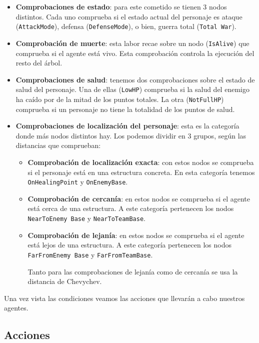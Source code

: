 \begin{itemize}
    \item \textbf{Comprobaciones de estado}: para este cometido se tienen 3 nodos distintos. Cada uno comprueba si el estado actual del personaje es ataque (\texttt{AttackMode}), defensa (\texttt{DefenseMode}), o bien, guerra total (\texttt{Total War}).
    \item \textbf{Comprobación de muerte}: esta labor recae sobre un nodo (\texttt{IsAlive}) que comprueba si el agente está vivo. Esta comprobación controla la ejecución del resto del árbol.
    \item \textbf{Comprobaciones de salud}: tenemos dos comprobaciones sobre el estado de salud del personaje. Una de ellas (\texttt{LowHP}) comprueba si la salud del enemigo ha caído por de la mitad de los puntos totales. La otra (\texttt{NotFullHP}) comprueba si un personaje no tiene la totalidad de los puntos de salud.
    \item \textbf{Comprobaciones de localización del personaje}: esta es la categoría donde más nodos distintos hay. Los podemos dividir en 3 grupos, según las distancias que comprueban:
        \begin{itemize}
            \item \textbf{Comprobación de localización exacta}: con estos nodos se comprueba si el personaje está en una estructura concreta. En esta categoría tenemos \texttt{OnHealingPoint} y \texttt{OnEnemyBase}. 
            \item \textbf{Comprobación de cercanía}: en estos nodos se comprueba si el agente está cerca de una estructura. A este categoría pertenecen los nodos \texttt{NearToEnemy Base} y \texttt{NearToTeamBase}.
            \item \textbf{Comprobación de lejanía}: en estos nodos se comprueba si el agente está lejos de una estructura. A este categoría pertenecen los nodos \texttt{FarFromEnemy Base} y \texttt{FarFromTeamBase}.
            
            Tanto para las comprobaciones de lejanía como de cercanía se usa la distancia de Chevychev. 
        \end{itemize}
\end{itemize}

Una vez vista las condiciones veamos las acciones que llevarán a cabo nuestros agentes.

\subsection{Acciones}


